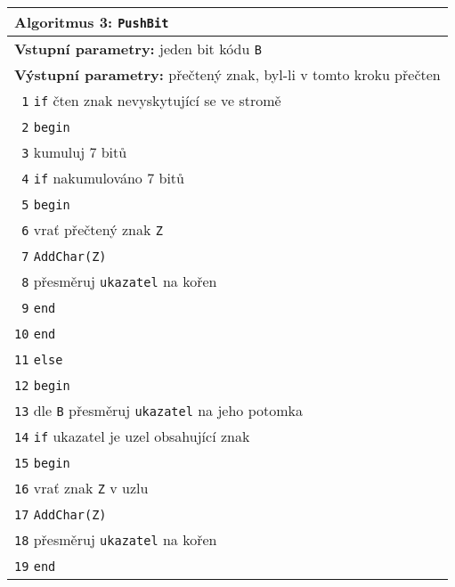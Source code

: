 \begin{table}[!h]
\centering
\begin{tabular}{|l|}
\hline
\textbf{Algoritmus 3:} \texttt{PushBit}\\
\hline
\textbf{Vstupní parametry:} jeden bit kódu \texttt{B}\\
\textbf{Výstupní parametry:} přečtený znak, byl-li v tomto kroku přečten\\
\hline
\texttt{ 1} \texttt{if} čten znak nevyskytující se ve stromě\\
\texttt{ 2} \texttt{begin}\\
\texttt{ 3} \hspace*{5mm}kumuluj 7 bitů\\
\texttt{ 4} \hspace*{5mm}\texttt{if} nakumulováno 7 bitů\\
\texttt{ 5} \hspace*{5mm}\texttt{begin}\\
\texttt{ 6} \hspace*{10mm}vrať přečtený znak \texttt{Z}\\
\texttt{ 7} \hspace*{10mm}\texttt{AddChar(Z)}\\
\texttt{ 8} \hspace*{10mm}přesměruj \texttt{ukazatel} na kořen\\
\texttt{ 9} \hspace*{5mm}\texttt{end}\\
\texttt{10} \texttt{end}\\
\texttt{11} \texttt{else}\\
\texttt{12} \texttt{begin}\\
\texttt{13} \hspace*{5mm}dle \texttt{B} přesměruj \texttt{ukazatel} na jeho potomka\\
\texttt{14} \hspace*{5mm}\texttt{if} ukazatel je uzel obsahující znak\\
\texttt{15} \hspace*{5mm}\texttt{begin}\\
\texttt{16} \hspace*{10mm}vrať znak \texttt{Z} v uzlu\\
\texttt{17} \hspace*{10mm}\texttt{AddChar(Z)}\\
\texttt{18} \hspace*{10mm}přesměruj \texttt{ukazatel} na kořen\\
\texttt{19} \hspace*{5mm}\texttt{end}\\

\end{tabular}
\end{table}
